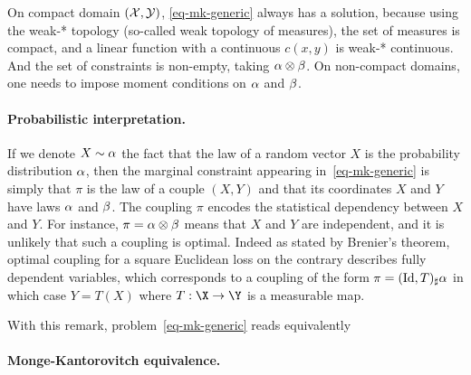 

On compact domain $(\mathcal{X},\mathcal{Y})$, \eqref{eq-mk-generic} always has a solution, because using the weak-* topology (so-called weak topology of measures), the set of measures is compact, and a linear function with a continuous $c(x,y)$ is weak-* continuous. And the set of constraints is non-empty, taking $\alpha \otimes \beta$. On non-compact domains, one needs to impose moment conditions on $\alpha$ and $\beta$.

\paragraph{Probabilistic interpretation.}

If we denote $X \sim \alpha$ the fact that the law of a random vector $X$ is the probability distribution $\alpha$, then the marginal constraint appearing in~\eqref{eq-mk-generic} is simply that $\pi$ is the law of a couple $(X,Y)$ and that its coordinates $X$ and $Y$ have laws $\alpha$ and $\beta$. The coupling $\pi$ encodes the statistical dependency between $X$ and $Y$. For instance, $\pi = \alpha\otimes \beta$ means that $X$ and $Y$ are independent, and it is unlikely that such a coupling is optimal. Indeed as stated by Brenier's theorem, optimal coupling for a square Euclidean loss on the contrary describes fully dependent variables, which corresponds to a coupling of the form $\pi=(\mathrm{Id},T)_\sharp \alpha$ in which case $Y=T(X)$ where $T: \X \rightarrow \Y$ is a measurable map. 

With this remark, problem~\eqref{eq-mk-generic} reads equivalently 

\paragraph{Monge-Kantorovitch equivalence.}

